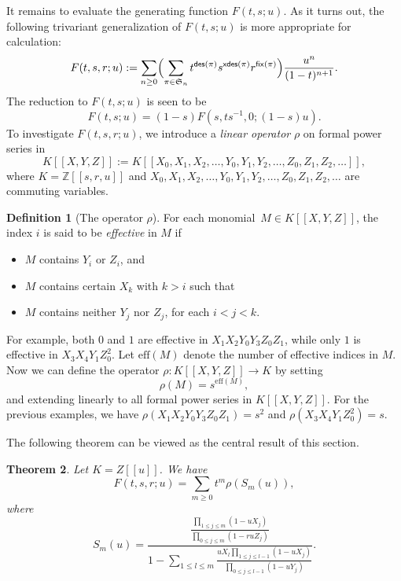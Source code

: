 \documentclass[12pt]{amsart} %
\numberwithin{equation}{section}
\theoremstyle{plain}
\newtheorem{theorem}{Theorem}[section]
\theoremstyle{definition}
\newtheorem{Def}[theorem]{Definition}
\def\xdes{\mathsf{xdes}}
\def\fix{\mathsf{fix}}
\def\des{\mathsf{des}}
\def\S{\mathfrak{S}}
\def\eff{\mathrm{eff}}
\begin{document}
It remains to evaluate the generating function $F(t,s;u)$. As it turns out, the following trivariant generalization of $F(t,s;u)$ is more appropriate for calculation:
\begin{equation}
F(t,s,r; u):=\sum_{n\geq 0} \Bigl( \sum_{\pi\in \S_n} 
	 t^{\des(\pi)}  s^{\xdes(\pi)} r^{\fix(\pi)}\Bigr) \frac {u^n}{(1-t)^{n+1}}.
\end{equation}
The reduction to $F(t,s;u)$ is seen to be
\begin{equation*}
F(t,s;u)=(1-s)F(s,ts^{-1},0;(1-s)u).
\end{equation*}
To investigate $F(t,s,r; u)$, we introduce a {\it linear operator} $\rho$ on formal power series in 
$$K[[X,Y,Z]]:=K[[X_0,X_1,X_2,\ldots, Y_0, Y_1, Y_2, \ldots, Z_0, Z_1, Z_2,\ldots]],$$ 
where 
$K=\mathbb{Z}[[s,r,u]]$ and
$X_0,X_1,X_2,\ldots, Y_0, Y_1, Y_2, \ldots, Z_0, Z_1, Z_2,\ldots$ are commuting variables.

\begin{Def}[The operator $\rho$]
For each monomial~$M\in K[[X,Y,Z]]$, the index $i$ is said to be {\em effective} in $M$ if
\begin{itemize}
	\item[i)] $M$ contains $Y_i$ or $Z_i$, and
	\item[ii)] $M$ contains certain $X_k$ with $k>i$ such that
	\item[iii)] $M$ contains neither $Y_j$ nor $Z_j$, for each $i<j<k$.
\end{itemize}
For example, both $0$ and $1$ are effective in $X_1X_2Y_0Y_3Z_0Z_1$, while only $1$ is effective in $X_3X_4Y_1Z_0^2$. Let $\eff(M)$ denote the number of effective indices in $M$. Now we can define the operator $\rho: K[[X,Y,Z]]\rightarrow K$ by setting
\begin{equation}
\rho(M)=s^{\eff(M)},
\end{equation}
and extending linearly to all formal power series in $K[[X,Y,Z]]$. For the previous examples, we have $\rho(X_1X_2Y_0Y_3Z_0Z_1)=s^2$ and $\rho(X_3X_4Y_1Z_0^2)=s$.
\end{Def}

The following theorem can be viewed as the central result of this section.
\begin{theorem}\label{gfF:frac} Let $K=Z[[u]]$. We have
	\begin{equation}\label{eq:rhofrac}
		F(t,s,r ;u) = \sum_{m\geq 0} t^m \rho(S_m(u)),
	\end{equation}
	where
	\begin{equation}\label{def:Sm}
		S_m(u) = 
		\frac{\displaystyle \frac{\prod_{1\leq j \leq m}(1-uX_j)}{\prod_{0\le j\le m}(1-ruZ_j)}}{\displaystyle 1-\sum_{1\leq l \leq m} 
		\frac{u X_l \prod_{1\leq j \leq l-1}(1-u X_j)}{\prod_{0\leq j \leq l-1}(1-uY_j)}}.
	\end{equation}
\end{theorem}
\end{document}

